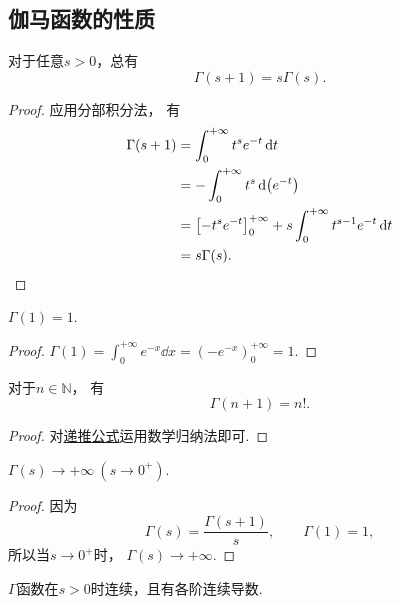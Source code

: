 \subsection{伽马函数的性质}
\begin{property}
对于任意\(s > 0\)，总有
\begin{equation}\label{equation:伽马函数.递推公式}
	\Gamma(s+1) = s \Gamma(s).
\end{equation}
\begin{proof}
应用分部积分法，
有\begin{align*}
	\Gamma(s+1)
	&= \int_0^{+\infty} t^s e^{-t} \dd{t} \\
	&= -\int_0^{+\infty} t^s \dd(e^{-t}) \\
	&= \left[-t^s e^{-t}\right]_0^{+\infty}
		+ s \int_0^{+\infty} t^{s-1} e^{-t} \dd{t} \\
	&= s \Gamma(s).
	\qedhere
\end{align*}
\end{proof}
\end{property}

\begin{property}
\(\Gamma(1) = 1\).
\begin{proof}
\(\Gamma(1)
= \int_0^{+\infty} e^{-x} \dd{x}
= \left(-e^{-x}\right)_0^{+\infty}
= 1\).
\end{proof}
\end{property}

\begin{property}
对于\(n\in\mathbb{N}\)，
有\begin{equation}\label{equation:定积分.伽马函数与阶乘的联系}
	\Gamma(n+1) = n!.
\end{equation}
\begin{proof}
对\hyperref[equation:伽马函数.递推公式]{递推公式}运用数学归纳法即可.
\end{proof}
\end{property}

\begin{property}
\(\Gamma(s)\to+\infty\ (s\to0^+)\).
\begin{proof}
因为\[
	\Gamma(s) = \frac{\Gamma(s+1)}{s},
	\qquad
	\Gamma(1) = 1,
\]
所以当\(s\to0^+\)时，
\(\Gamma(s)\to+\infty\).
\end{proof}
\end{property}

\begin{proposition}
\(\Gamma\)函数在\(s > 0\)时连续，且有各阶连续导数.
\end{proposition}

